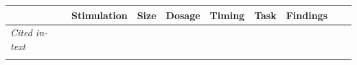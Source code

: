 \documentclass[11pt,english,]{memoir}
\begin{document}
\begin{longtable}[]{@{}lllllllll@{}}
\begin{minipage}[b]{0.05\columnwidth}
\end{minipage} & \begin{minipage}[b]{0.15\columnwidth}\raggedright
Stimulation\strut
\end{minipage} & \begin{minipage}[b]{0.04\columnwidth}\raggedright
Size\strut
\end{minipage} & \begin{minipage}[b]{0.06\columnwidth}\raggedright
Dosage\strut
\end{minipage} & \begin{minipage}[b]{0.05\columnwidth}\raggedright
Timing\strut
\end{minipage} & \begin{minipage}[b]{0.06\columnwidth}\raggedright
Task\strut
\end{minipage} & \begin{minipage}[b]{0.25\columnwidth}\raggedright
Findings\strut
\end{minipage}\tabularnewline
\midrule
\endhead
\begin{minipage}[t]{0.08\columnwidth}\raggedright
\emph{Cited in-text}\strut
\end{minipage} & \begin{minipage}[t]{0.03\columnwidth}\raggedright
\strut
\end{minipage} & \begin{minipage}[t]{0.05\columnwidth}\raggedright
\strut
\end{minipage} & \begin{minipage}[t]{0.15\columnwidth}\raggedright
\strut
\end{minipage} & \begin{minipage}[t]{0.04\columnwidth}\raggedright
\strut
\end{minipage} & \begin{minipage}[t]{0.06\columnwidth}\raggedright
\strut
\end{minipage} & \begin{minipage}[t]{0.05\columnwidth}\raggedright
\strut
\end{minipage} & \begin{minipage}[t]{0.06\columnwidth}\raggedright
\strut
\end{minipage} & \begin{minipage}[t]{0.25\columnwidth}\raggedright
\strut
\end{minipage}\tabularnewline
\begin{minipage}[t]{0.08\columnwidth}\raggedright
\textcite{Ball2013}\strut
\end{minipage} & \begin{minipage}[t]{0.03\columnwidth}\raggedright

\end{minipage}
\end{longtable}
\end{document}
